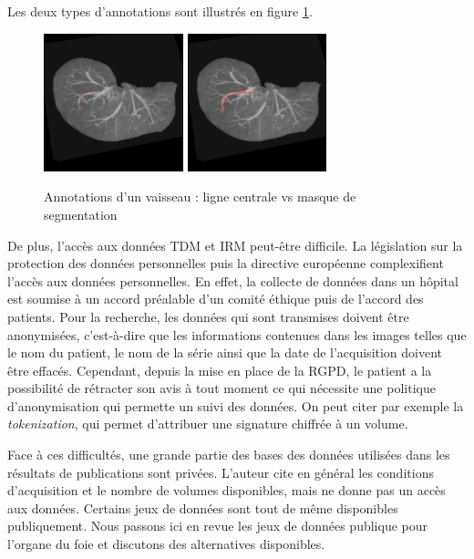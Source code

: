 Les deux types d'annotations sont illustrés en figure \ref{fig:annotations}. 

\begin{figure}
    \centering
    \includegraphics[height=4cm]{Images/centerline.png}
    \includegraphics[height=4cm]{Images/segmentation.png}
    \caption{Annotations d'un vaisseau : ligne centrale vs masque de segmentation}
    \label{fig:annotations}
\end{figure}

De plus, l'accès aux données TDM et IRM peut-être difficile. La législation sur la protection des données personnelles puis la directive européenne complexifient l'accès aux données personnelles. En effet, la collecte de données dans un hôpital est soumise à un accord préalable d'un comité éthique puis de l'accord des patients. Pour la recherche, les données qui sont transmises doivent être anonymisées, c'est-à-dire que les informations contenues dans les images telles que le nom du patient, le nom de la série ainsi que la date de l'acquisition doivent être effacés. Cependant, depuis la mise en place de la RGPD, le patient a la possibilité de rétracter son avis à tout moment ce qui nécessite une politique d'anonymisation qui permette un suivi des données. On peut citer par exemple la \textit{tokenization}, qui permet d'attribuer une signature chiffrée à un volume.

Face à ces difficultés, une grande partie des bases des données utilisées dans les résultats de publications sont privées. L'auteur cite en général les conditions d'acquisition et le nombre de volumes disponibles, mais ne donne pas un accès aux données. Certains jeux de données sont tout de même disponibles publiquement. Nous passons ici en revue les jeux de données publique pour l'organe du foie et discutons des alternatives disponibles.

